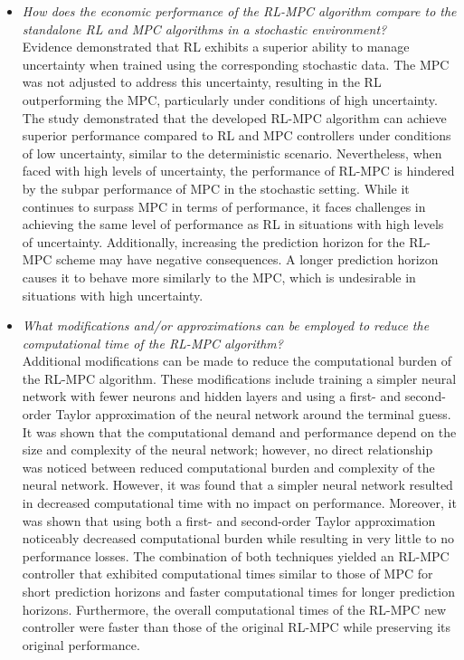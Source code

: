 \begin{itemize}[itemsep=7pt] %
	\item \textit{How does the economic performance of the RL-MPC algorithm compare to the standalone RL and MPC algorithms in a stochastic environment?} 
	\\Evidence demonstrated that RL exhibits a superior ability to manage uncertainty when trained using the corresponding stochastic data. The MPC was not adjusted to address this uncertainty, resulting in the RL outperforming the MPC, particularly under conditions of high uncertainty. The study demonstrated that the developed RL-MPC algorithm can achieve superior performance compared to RL and MPC controllers under conditions of low uncertainty, similar to the deterministic scenario. Nevertheless, when faced with high levels of uncertainty, the performance of RL-MPC is hindered by the subpar performance of MPC in the stochastic setting. While it continues to surpass MPC in terms of performance, it faces challenges in achieving the same level of performance as RL in situations with high levels of uncertainty. Additionally, increasing the prediction horizon for the RL-MPC scheme may have negative consequences. A longer prediction horizon causes it to behave more similarly to the MPC, which is undesirable in situations with high uncertainty.
\end{itemize}

\begin{itemize}[itemsep=7pt] %
	\item \textit{What modifications and/or approximations can be employed to reduce the computational time of the RL-MPC algorithm?}
	\\Additional modifications can be made to reduce the computational burden of the RL-MPC algorithm. These modifications include training a simpler neural network with fewer neurons and hidden layers and using a first- and second-order Taylor approximation of the neural network around the terminal guess. It was shown that the computational demand and performance depend on the size and complexity of the neural network; however, no direct relationship was noticed between reduced computational burden and complexity of the neural network. However, it was found that a simpler neural network resulted in decreased computational time with no impact on performance. Moreover, it was shown that using both a first- and second-order Taylor approximation noticeably decreased computational burden while resulting in very little to no performance losses. The combination of both techniques yielded an RL-MPC controller that exhibited computational times similar to those of MPC for short prediction horizons and faster computational times for longer prediction horizons. Furthermore, the overall computational times of the RL-MPC new controller were faster than those of the original RL-MPC while preserving its original performance.
\end{itemize}


